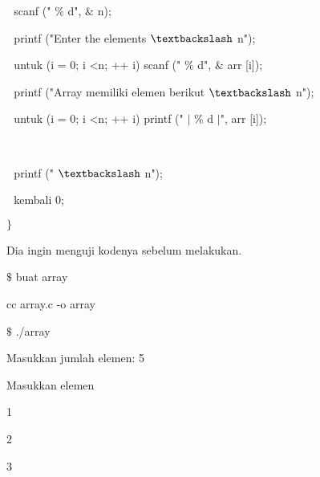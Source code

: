 \noindent 
 \hspace*{0.5in}  $  $ $  $ $  $scanf (" $  \%  $ d",  $  \&  $ n); \par
\vspace{12pt}
\noindent 
 \hspace*{0.5in}  $  $ $  $ $  $printf ("Enter the elements  $  \textbackslash  $ n"); \par
\vspace{12pt}
\noindent 
 \hspace*{0.5in}  $  $ $  $ $  $untuk (i = 0; i <n; ++ i) scanf (" $  \%  $ d",  $  \&  $ arr [i]); \par
\noindent 
 \hspace*{0.5in}  $  $ $  $ $  $printf ("Array memiliki elemen berikut  $  \textbackslash  $ n"); \par
\noindent 
 \hspace*{0.5in}  $  $ $  $ $  $untuk (i = 0; i <n; ++ i) printf (" $  \vert  $ $  \%  $ d  $  \vert  $", arr [i]); \par
\noindent 
 $  $ $  $ $  $ \par
\noindent 
 \hspace*{0.5in}  $  $ $  $ $  $printf (" $  \textbackslash  $ n"); \par
\noindent 
 \hspace*{0.5in}  $  $ $  $ $  $kembali 0; \par
\noindent 
 \hspace*{0.5in}  $  \}  $ \par
\vspace{12pt}
\noindent 
Dia ingin menguji kodenya sebelum melakukan. \par
\vspace{12pt}
  $  \$  $ buat array \par
\noindent 
cc array.c -o array \par
\vspace{12pt}
  $  \$  $ ./array \par
\noindent 
Masukkan jumlah elemen: 5 \par
\noindent 
Masukkan elemen \par
\noindent 
 \hspace*{0.5in} 1 \par
\noindent 
 \hspace*{0.5in} 2 \par
\noindent 
 \hspace*{0.5in} 3 \par
\noindent 
